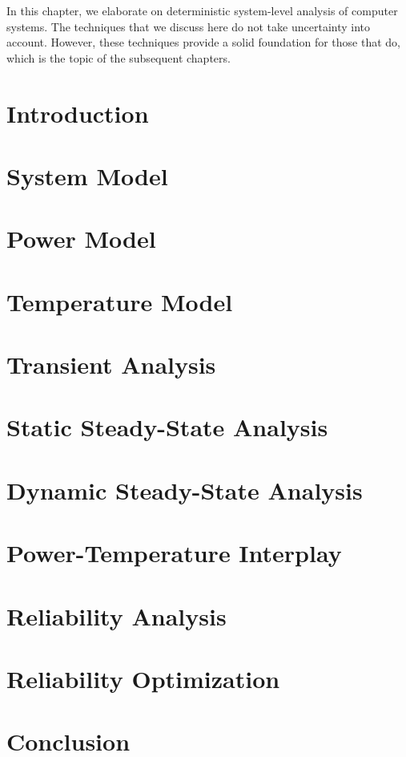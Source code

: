 In this chapter, we elaborate on deterministic system-level analysis of computer
systems. The techniques that we discuss here do not take uncertainty into
account. However, these techniques provide a solid foundation for those that do,
which is the topic of the subsequent chapters.

\section{Introduction}

\section{System Model}

\section{Power Model}

\section{Temperature Model}

\section{Transient Analysis}

\section{Static Steady-State Analysis}

\section{Dynamic Steady-State Analysis}

\section{Power-Temperature Interplay}

\section{Reliability Analysis}

\section{Reliability Optimization}

\section{Conclusion}
